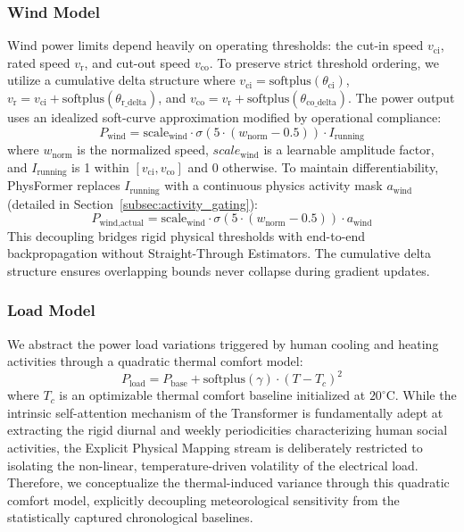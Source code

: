 \subsubsection{Wind Model}
Wind power limits depend heavily on operating thresholds: the cut-in speed $v_{\text{ci}}$, rated speed $v_{\text{r}}$, and cut-out speed $v_{\text{co}}$. To preserve strict threshold ordering, we utilize a cumulative delta structure where $v_{\text{ci}} = \text{softplus}(\theta_{\text{ci}})$, $v_{\text{r}} = v_{\text{ci}} + \text{softplus}(\theta_{\text{r\_delta}})$, and $v_{\text{co}} = v_{\text{r}} + \text{softplus}(\theta_{\text{co\_delta}})$. The power output uses an idealized soft-curve approximation modified by operational compliance:
\begin{equation}
    P_{\text{wind}} = \text{scale}_{\text{wind}} \cdot \sigma(5 \cdot (w_{\text{norm}} - 0.5)) \cdot I_{\text{running}}
\label{eq:wind_ideal}
\end{equation}
where $w_{\text{norm}}$ is the normalized speed, $scale_{\text{wind}}$ is a learnable amplitude factor, and $I_{\text{running}}$ is 1 within $[v_{\text{ci}}, v_{\text{co}}]$ and 0 otherwise. To maintain differentiability, PhysFormer replaces $I_{\text{running}}$ with a continuous physics activity mask $a_{\text{wind}}$ (detailed in Section~\ref{subsec:activity_gating}):
\begin{equation}
    P_{\text{wind,actual}} = \text{scale}_{\text{wind}} \cdot \sigma(5 \cdot (w_{\text{norm}} - 0.5)) \cdot a_{\text{wind}}
\label{eq:wind_actual}
\end{equation}
This decoupling bridges rigid physical thresholds with end-to-end backpropagation without Straight-Through Estimators. The cumulative delta structure ensures overlapping bounds never collapse during gradient updates.

\subsubsection{Load Model}
We abstract the power load variations triggered by human cooling and heating activities through a quadratic thermal comfort model:
\begin{equation}
    P_{\text{load}} = P_{\text{base}} + \text{softplus}(\gamma) \cdot (T - T_c)^2
\label{eq:load_model}
\end{equation}
where $T_c$ is an optimizable thermal comfort baseline initialized at $20^\circ\text{C}$. While the intrinsic self-attention mechanism of the Transformer is fundamentally adept at extracting the rigid diurnal and weekly periodicities characterizing human social activities, the Explicit Physical Mapping stream is deliberately restricted to isolating the non-linear, temperature-driven volatility of the electrical load. Therefore, we conceptualize the thermal-induced variance through this quadratic comfort model, explicitly decoupling meteorological sensitivity from the statistically captured chronological baselines.

